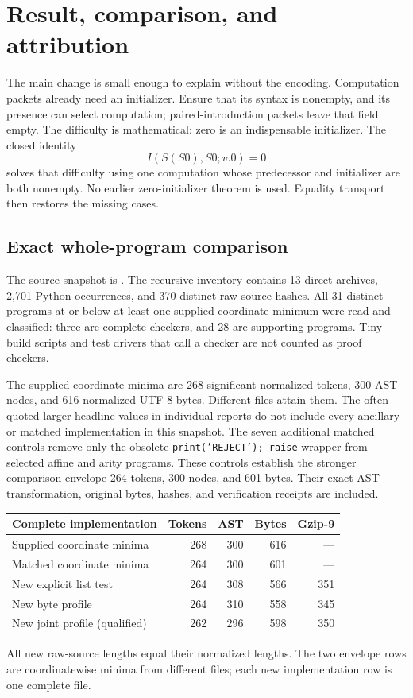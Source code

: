 \documentclass[11pt,letterpaper]{article}
\theoremstyle{definition}\newtheorem{definition}[theorem]{Definition}
\theoremstyle{remark}\newtheorem{remark}[theorem]{Remark}
\begin{document}
\section{Result, comparison, and attribution}
\label{sec:result}

The main change is small enough to explain without the encoding.
Computation packets already need an initializer. Ensure that its syntax
is nonempty, and its presence can select computation; paired-introduction
packets leave that field empty. The difficulty is mathematical: zero is
an indispensable initializer. The closed identity
\[
                  \boxed{I(S(S0),S0;v.0)=0}
\]
solves that difficulty using one computation whose predecessor and
initializer are both nonempty. No earlier zero-initializer theorem is
used. Equality transport then restores the missing cases.

\subsection{Exact whole-program comparison}

The source snapshot is \cite{corpus}. The recursive inventory contains
13 direct archives, 2,701 Python occurrences, and 370 distinct raw source
hashes. All 31 distinct programs at or below at least one supplied
coordinate minimum were read and classified: three are complete
checkers, and 28 are supporting programs. Tiny build scripts and test
drivers that call a checker are not counted as proof checkers.

The supplied coordinate minima are 268 significant normalized tokens,
300 AST nodes, and 616 normalized UTF-8 bytes. Different files attain
them. The often quoted larger headline values in individual reports do
not include every ancillary or matched implementation in this snapshot.
The seven additional matched controls remove only the obsolete
\texttt{print('REJECT'); raise} wrapper from selected affine and arity
programs. These controls establish the stronger comparison envelope
264 tokens, 300 nodes, and 601 bytes. Their exact AST transformation,
original bytes, hashes, and verification receipts are included.


\begin{center}
\small
\begin{tabular}{lrrrr}
\toprule
Complete implementation & Tokens & AST & Bytes & Gzip-9\\
\midrule
Supplied coordinate minima & 268 & 300 & 616 & ---\\
Matched coordinate minima & 264 & 300 & 601 & ---\\
\midrule
New explicit list test & 264 & 308 & 566 & 351\\
New byte profile & 264 & 310 & 558 & 345\\
New joint profile (qualified) & 262 & 296 & 598 & 350\\
\bottomrule
\end{tabular}
\end{center}
All new raw-source lengths equal their normalized lengths. 
The two envelope rows are coordinatewise minima from different files; 
each new implementation row is one complete file.
\end{document}
